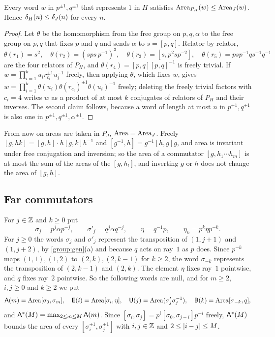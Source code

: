 \begin{lemma}[From $P_J$ to $P_H$]\label{dehn:PJ}
Every word $w$ in $p^{\pm1},q^{\pm1}$ that represents $1$ in $H$ satisfies $\operatorname{Area}_{P_H}(w)\le\operatorname{Area}_J(w)$. Hence $\delta_{H}(n)\le\delta_J(n)$ for every
$n$.
\end{lemma}

\begin{proof}
Let $\theta$ be the homomorphism from the free group on $p,q,\alpha$ to the free group on $p,q$ that fixes $p$ and $q$ and sends $\alpha$ to
$s=[p,q]$. Relator by relator,
\[
\theta(r_1)=s^2,\quad\theta(r_2)=(sps\,p^{-1})^3,\quad\theta(r_3)=[s,p^2sp^{-2}],\quad\theta(r_5)=psp^{-1}qs^{-1}q^{-1}
\]
are the four relators of $P_H$, and $\theta(r_4)=[p,q][p,q]^{-1}$ is freely trivial. If $w=\prod_{i=1}^ku_ir_{c_i}^{\pm1}u_i^{-1}$ freely, then
applying $\theta$, which fixes $w$, gives $w=\prod_{i=1}^k\theta(u_i)\theta(r_{c_i})^{\pm1}\theta(u_i)^{-1}$ freely; deleting the freely
trivial factors with $c_i=4$ writes $w$ as a product of at most $k$ conjugates of relators of $P_H$ and their inverses. The second claim
follows, because a word of length at most $n$ in $p^{\pm1},q^{\pm1}$ is also one in $p^{\pm1},q^{\pm1},\alpha^{\pm1}$.
\end{proof}

From now on areas are taken in $P_J$, $\operatorname{Area}=\operatorname{Area}_J$. Freely $[g,hk]=[g,h]\cdot h[g,k]h^{-1}$ and $[g^{-1},h]=g^{-1}[h,g]g$, and area is
invariant under free conjugation and inversion; so the area of a commutator $[g,h_1\cdots h_m]$ is at most the sum of the areas of the
$[g,h_l]$, and inverting $g$ or $h$ does not change the area of $[g,h]$.

\subsection{Far commutators}\label{dehn:sec-far}

For $j\in\mathbb Z$ and $k\ge0$ put
\[
\sigma_j=p^j\alpha p^{-j},\qquad \sigma'_j=q^j\alpha q^{-j},\qquad \eta=q^{-1}p,\qquad \eta_k=p^k\eta p^{-k}.
\]
For $j\ge0$ the words $\sigma_j$ and $\sigma'_j$ represent the transposition of $(1,j+1)$ and $(1,j+2)$, by \cref{group:gen}(a) and because
$q$ acts on ray~$1$ as $p$ does. Since $p^{-k}$ maps $(1,1),(1,2)$ to $(2,k),(2,k-1)$ for $k\ge2$, the word $\sigma_{-k}$ represents the
transposition of $(2,k-1)$ and $(2,k)$. The element $\eta$ fixes ray~$1$ pointwise, and $q$ fixes ray~$2$ pointwise. So the following words
are null, and for $m\ge2$, $i,j\ge0$ and $k\ge2$ we put
\[
\mathsf A(m)=\operatorname{Area}[\sigma_0,\sigma_m],\quad \mathsf E(i)=\operatorname{Area}[\sigma_i,\eta],\quad \mathsf U(j)=\operatorname{Area}(\sigma'_j\sigma_j^{-1}),\quad
\mathsf B(k)=\operatorname{Area}[\sigma_{-k},q],
\]
and $\mathsf A^*(M)=\max_{2\le m\le M}\mathsf A(m)$. Since $[\sigma_i,\sigma_j]=p^i[\sigma_0,\sigma_{j-i}]p^{-i}$ freely, $\mathsf A^*(M)$ bounds the
area of every $[\sigma_i^{\pm1},\sigma_j^{\pm1}]$ with $i,j\in\mathbb Z$ and $2\le\lvert i-j\rvert\le M$.


